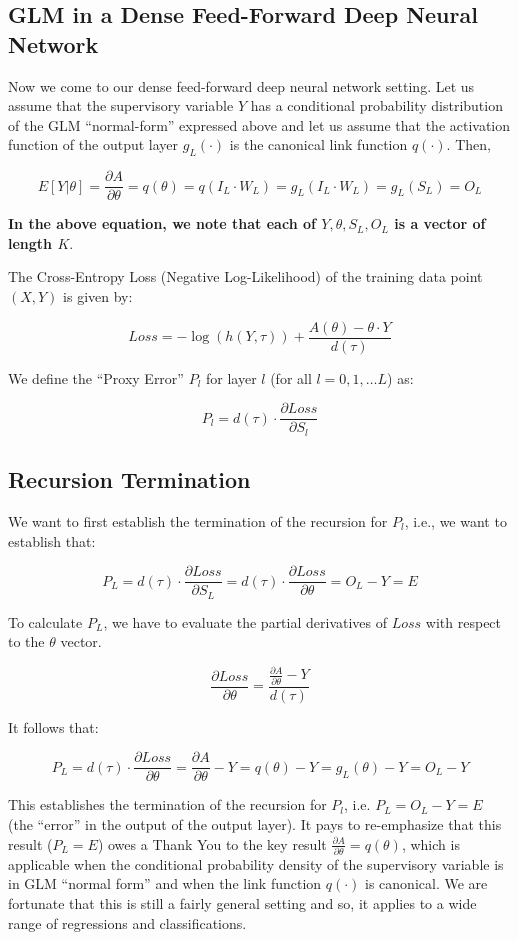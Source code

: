 \documentclass[10pt]{amsart}
\begin{document}
\subsection{GLM in a Dense Feed-Forward Deep Neural Network}
Now we come to our dense feed-forward deep neural network setting. Let us assume that the supervisory variable $Y$ has a conditional probability distribution of the GLM ``normal-form'' expressed above and let us assume that the activation function of the output layer $g_L(\cdot)$ is the canonical link function $q(\cdot)$. Then, 

$$E[Y|\theta] = \frac {\partial A} {\partial \theta} = q(\theta) = q(I_L \cdot W_L) = g_L(I_L \cdot W_L) = g_L(S_L) = O_L$$

{\bf In the above equation, we note that each of $Y, \theta, S_L, O_L$ is a vector of length $K$}.

The Cross-Entropy Loss (Negative Log-Likelihood) of the training data point $(X, Y)$ is given by:

$$Loss = - \log{(h(Y, \tau))} + \frac {A(\theta) - \theta \cdot Y} {d(\tau)}$$

We define the ``Proxy Error'' $P_l$ for layer $l$ (for all $l = 0, 1, \ldots L$) as:

$$P_l = d(\tau) \cdot \frac {\partial Loss} {\partial S_l}$$

\subsection{Recursion Termination}

We want to first establish the termination of the recursion for $P_l$, i.e., we want to establish that:

$$P_L = d(\tau) \cdot \frac {\partial Loss} {\partial S_L} = d(\tau) \cdot \frac {\partial Loss} {\partial \theta} = O_L - Y = E$$

To calculate $P_L$, we have to evaluate the partial derivatives of $Loss$ with respect to the $\theta$ vector.

$$\frac {\partial Loss} {\partial \theta} = \frac {\frac {\partial A} {\partial \theta} - Y} {d(\tau)}$$

It follows that:

$$P_L = d(\tau) \cdot \frac {\partial Loss} {\partial \theta} = \frac {\partial A} {\partial \theta} - Y = q(\theta) - Y = g_L(\theta) - Y = O_L - Y$$

This establishes the termination of the recursion for $P_l$, i.e. $P_L = O_L - Y = E$ (the ``error'' in the output of the output layer). It pays to re-emphasize that this result ($P_L = E$) owes a Thank You to the key result $\frac {\partial A} {\partial \theta} = q(\theta)$, which is applicable when the conditional probability density of the supervisory variable is in GLM ``normal form'' and when the link function $q(\cdot)$ is canonical. We are fortunate that this is still a fairly general setting and so, it applies to a wide range of regressions and classifications.
\end{document}
